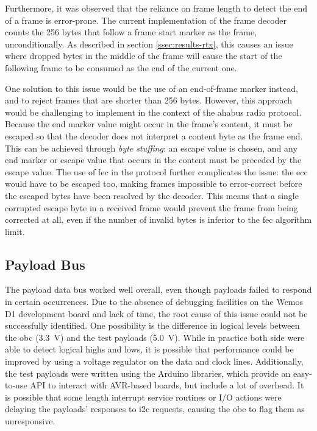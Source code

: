 Furthermore, it was observed that the reliance on frame length to detect the
end of a frame is error-prone. The current implementation of the frame decoder
counts the 256 bytes that follow a frame start marker as the frame,
unconditionally. As described in section \ref{ssec:results-rtx}, this causes
an issue where dropped bytes in the middle of the frame will cause the start
of the following frame to be consumed as the end of the current one.

One solution to this issue would be the use of an end-of-frame marker instead,
and to reject frames that are shorter than 256 bytes. However, this approach
would be challenging to implement in the context of the \acrshort{ahabus} radio
protocol. Because the end marker value might occur in the frame's content, it
must be escaped so that the decoder does not interpret a content byte as the
frame end. This can be achieved through \textit{byte stuffing}: an escape value
is chosen, and any end marker or escape value that occurs in the content must
be preceded by the escape value. The use of \acrlong{fec} in the protocol
further complicates the issue: the \acrlong{ecc} would have to be escaped too,
making frames impossible to error-correct before the escaped bytes have been
resolved by the decoder. This means that a single corrupted escape byte in a
received frame would prevent the frame from being corrected at all, even if the
number of invalid bytes is inferior to the \acrshort{fec} algorithm limit.

\subsection{Payload Bus}
\label{ssec:discussion-bus}

The payload data bus worked well overall, even though payloads failed to
respond in certain occurrences. Due to the absence of debugging facilities on
the Wemos D1 development board and lack of time, the root cause of this issue
could not be successfully identified. One possibility is the difference in
logical levels between the \acrlong{obc} (\SI{3.3}{\volt}) and the test
payloads (\SI{5.0}{\volt}). While in practice both side were able to detect
logical highs and lows, it is possible that performance could be improved by
using a voltage regulator on the data and clock lines. Additionally, the test
payloads were written using the Arduino libraries, which provide an easy-to-use
API to interact with AVR-based boards, but include a lot of overhead. It is
possible that some length interrupt service routines or I/O actions were
delaying the payloads' responses to \acrshort{i2c} requests, causing the
\acrshort{obc} to flag them as unresponsive.

